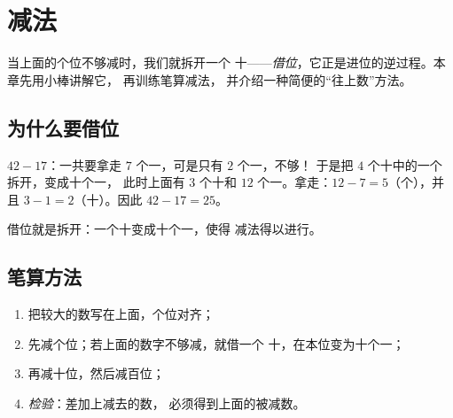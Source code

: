 \chapter{减法}\label{ch:g2:subtraction}

当上面的个位不够减时，我们就拆开一个
十——\emph{借位}，它正是进位的逆过程。本章先用小棒讲解它，
再训练笔算减法，
并介绍一种简便的“往上数”方法。

\section{为什么要借位}

\begin{example}[拆开一个十]\label{ex:g2:subtraction:unbundle}
$42 - 17$：一共要拿走 $7$ 个一，可是只有 $2$ 个一，不够！
于是把 $4$ 个十中的一个拆开，变成十个一，
此时上面有 $3$ 个十和 $12$ 个一。拿走：$12 - 7 = 5$（个），并且
$3 - 1 = 2$（十）。因此 $42 - 17 = 25$。
\end{example}

\begin{omfigure}

{\small 借位就是拆开：一个十变成十个一，使得
减法得以进行。}
\end{omfigure}

\section{笔算方法}

\begin{method}[竖式减法]\label{met:g2:subtraction:column}
\begin{enumerate}
  \item 把较大的数写在上面，个位对齐；
  \item 先减个位；若上面的数字不够减，就借一个
        十，在本位变为十个一；
  \item 再减十位，然后减百位；
  \item \emph{检验}：差加上减去的数，
        必须得到上面的被减数。
\end{enumerate}
\end{method}

